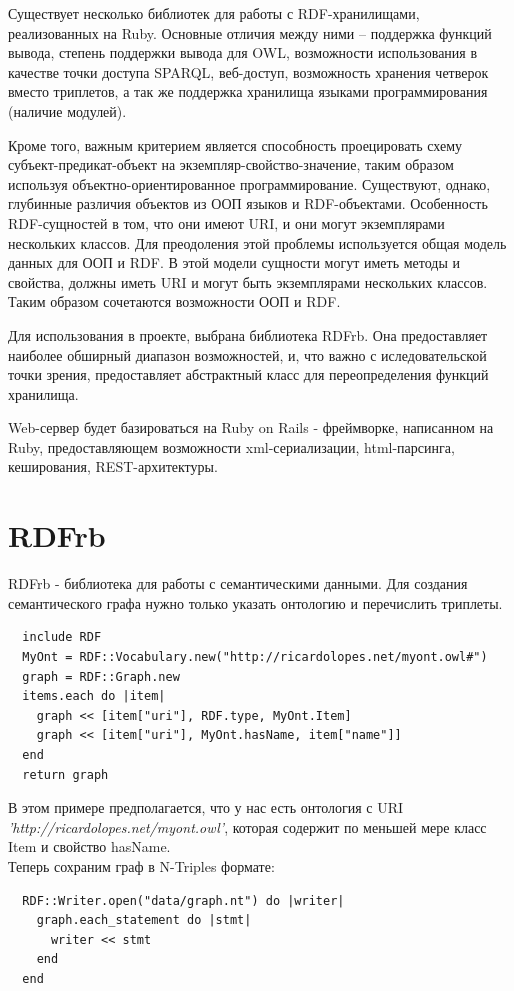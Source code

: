\documentclass[specialist,subf,href,colorlinks=true
]{disser}
\begin{document}
Существует несколько библиотек для работы с RDF-хранилищами, реализованных на Ruby. Основные отличия между ними – поддержка функций вывода, степень поддержки вывода для OWL, возможности использования в качестве точки доступа SPARQL, веб-доступ, возможность хранения четверок вместо триплетов, а так же поддержка хранилища языками программирования (наличие модулей). \cite{rubysem}

Кроме того, важным критерием является способность проецировать схему субъект-предикат-объект на экземпляр-свойство-значение, таким образом используя объектно-ориентированное программирование. Существуют, однако, глубинные различия объектов из ООП языков и RDF-объектами. Особенность RDF-сущностей в том, что они имеют URI, и они могут экземплярами нескольких классов. Для преодоления этой проблемы используется общая модель данных для ООП и RDF. В этой модели сущности могут иметь методы и свойства, должны иметь URI и могут быть экземплярами нескольких классов. Таким образом сочетаются возможности ООП и RDF.

Для использования в проекте, выбрана библиотека RDFrb. Она предоставляет наиболее обширный диапазон возможностей, и, что важно с иследовательской точки зрения, предоставляет абстрактный класс для переопределения функций хранилища. \cite{rdfrb}

Web-сервер будет базироваться на Ruby on Rails - фреймворке, написанном на Ruby, предоставляющем возможности xml-сериализации, html-парсинга, кеширования, REST-архитектуры.
\section{RDFrb}
RDFrb - библиотека для работы с семантическими данными. Для создания семантического графа нужно только указать онтологию и перечислить триплеты.
\begin{lstlisting}
  include RDF
  MyOnt = RDF::Vocabulary.new("http://ricardolopes.net/myont.owl#")
  graph = RDF::Graph.new
  items.each do |item|
    graph << [item["uri"], RDF.type, MyOnt.Item]
    graph << [item["uri"], MyOnt.hasName, item["name"]]
  end
  return graph
\end{lstlisting}
В этом примере предполагается, что у нас есть онтология с URI 
\\ \textit{'http://ricardolopes.net/myont.owl'}, которая содержит по меньшей мере класс Item и свойство hasName.
\\Теперь сохраним граф в N-Triples формате:
\begin{lstlisting}
  RDF::Writer.open("data/graph.nt") do |writer|
    graph.each_statement do |stmt|
      writer << stmt
    end
  end
\end{lstlisting}
\end{document}
